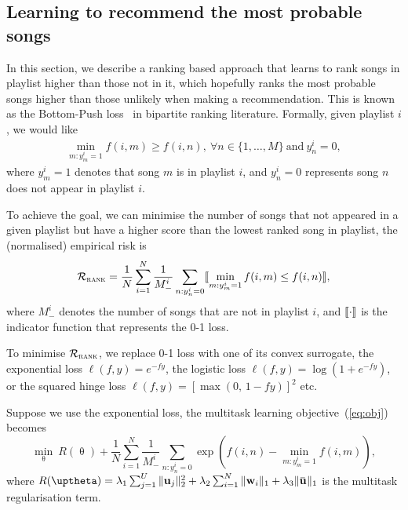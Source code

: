 \subsection{Learning to recommend the most probable songs}
\label{ssec:bploss}

In this section, we describe a ranking based approach that learns to rank songs in playlist higher 
than those not in it, which hopefully ranks the most probable songs higher than those unlikely when making a recommendation.
This is known as the Bottom-Push loss~\cite{rudin2009p} in bipartite ranking literature.
Formally, given playlist $i$, we would like
\begin{equation*}
\begin{aligned}
\min_{m: y_m^i = 1} f(i, m) \ge f(i, n), \ \forall n \in \{1,\dots,M\} \ \text{and} \ y_n^i = 0,
\end{aligned}
\end{equation*}
where $y_m^i = 1$ denotes that song $m$ is in playlist $i$,
and $y_n^i = 0$ represents song $n$ does not appear in playlist $i$.

To achieve the goal, we can minimise the number of songs that not appeared in a given playlist
but have a higher score than the lowest ranked song in playlist, \ie the (normalised) empirical risk is
\begin{equation}
\label{eq:bprisk}
\mathcal{R}_\textsc{rank} = \frac{1}{N} \sum_{i=1}^N \frac{1}{M_-^i} \sum_{n: y_n^i = 0} \llbracket \min_{m: y_m^i = 1} f(i, m) \le f(i, n) \rrbracket,
\end{equation}
where $M_-^i$ denotes the number of songs that are not in playlist $i$,
and $\llbracket \cdot \rrbracket$ is the indicator function that represents the 0-1 loss.

To minimise $\mathcal{R}_\textsc{rank}$, we replace 0-1 loss with one of its convex surrogate,
\eg the exponential loss $\ell(f, y) = e^{-fy}$, the logistic loss $\ell(f, y) = \log(1 + e^{-fy})$,
or the squared hinge loss $\ell(f, y) = [\max(0, \, 1 - fy)]^2$ etc.

Suppose we use the exponential loss, the multitask learning objective~(\ref{eq:obj}) becomes
\begin{equation}
\label{eq:expobj}
\min_{\uptheta} \ R(\uptheta) + \frac{1}{N} \sum_{i=1}^N \frac{1}{M_-^i} \sum_{n: y_n^i = 0} \exp \left(f(i, n) - \min_{m: y_m^i = 1} f(i, m) \right),
\end{equation}
where $R(\uptheta) = \lambda_1 \sum_{j=1}^U \|\bu_j\|_2^2 + \lambda_2 \sum_{i=1}^N \|\w_i\|_1 + \lambda_3 \|\widebar\bu\|_1$ 
is the multitask regularisation term.




